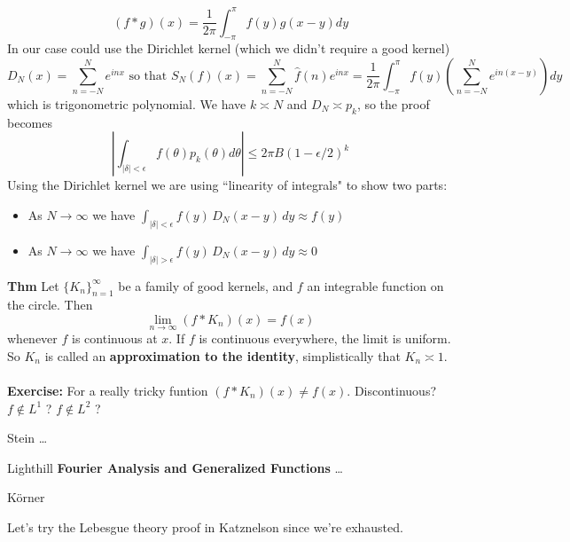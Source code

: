 \documentclass[12pt]{article}
\begin{document}
$$ (f * g)(x) = \frac{1}{2\pi}\int_{-\pi}^\pi f(y)g(x-y) dy $$
In our case could use the Dirichlet kernel (which we didn't require a good kernel)
$$ D_N(x) = \sum_{n = -N}^N e^{inx} \text{ so that } S_N(f) (x) = \sum_{n = - N}^N \hat{f}(n) e^{inx} = \frac{1}{2\pi} \int_{-\pi}^\pi f(y) \left( \sum_{n = - N}^N e^{in(x-y)} \right) dy $$
which is trigonometric polynomial. We have $k \asymp N$  and $D_N \asymp p_k$, so the proof becomes   
$$ \left| \int_{|\delta| < \epsilon} f(\theta) p_k(\theta) d\theta \right| \leq 2\pi B (1 - \epsilon / 2)^k $$
Using the Dirichlet kernel we are using ``linearity of integrals" to show two parts:
\begin{itemize}
\item As $N \to \infty$ we have $\int_{|\delta| < \epsilon} f(y) \, D_N(x-y) \, dy \approx f(y) $
\item As $N \to \infty$ we have $\int_{|\delta| > \epsilon} f(y) \, D_N(x-y) \, dy \approx 0 $
\end{itemize}
\textbf{Thm} Let $\{ K_n \}_{n=1}^\infty$ be a family of good kernels, and $f$ an integrable function on the circle.  Then
$$ \lim_{n \to \infty} (f * K_n)(x) = f(x) $$
whenever $f$ is continuous at $x$.  If $f$ is continuous everywhere, the limit is uniform.  So $K_n$ is called an \textbf{approximation to the identity}, simplistically that $K_n \asymp 1$. \\ \\
\textbf{Exercise:} For a really tricky funtion $(f*K_n)(x) \neq f(x)$.  Discontinuous?  $f \notin L^1$ ? $f \notin L^2$ ?

\vfill



\begin{thebibliography}{}

\item Stein \dots
\item Lighthill \textbf{Fourier Analysis and Generalized Functions} \dots
\item K\"{o}rner 
\end{thebibliography}

\newpage

\noindent Let's try the Lebesgue theory proof in Katznelson since we're exhausted.  
\end{document}

